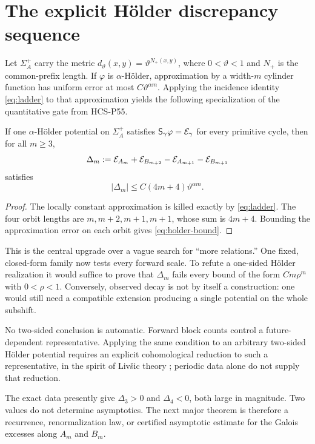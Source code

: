 \section{The explicit H\"older discrepancy sequence}

Let \(\Sigma_A^+\) carry the metric
\(d_\vartheta(x,y)=\vartheta^{N_+(x,y)}\), where \(0<\vartheta<1\) and
\(N_+\) is the common-prefix length.  If \(\varphi\) is
\(\alpha\)-H\"older, approximation by a width-\(m\) cylinder function has
uniform error at most \(C\vartheta^{\alpha m}\).  Applying the incidence
identity \eqref{eq:ladder} to that approximation yields the following
specialization of the quantitative gate from HCS-P55.

\begin{corollary}
\label{cor:holder}
If one \(\alpha\)-H\"older potential on \(\Sigma_A^+\) satisfies
\(\mathsf S_\gamma\varphi=\mathcal E_\gamma\) for every primitive cycle, then for
all \(m\geq3\),
\begin{equation}\label{eq:delta}
 \Delta_m:=\mathcal E_{A_m}+\mathcal E_{B_{m+2}}
 -\mathcal E_{A_{m+1}}-\mathcal E_{B_{m+1}}
\end{equation}
satisfies
\begin{equation}\label{eq:holder-bound}
 |\Delta_m|\leq C(4m+4)\vartheta^{\alpha m}.
\end{equation}
\end{corollary}

\begin{proof}
The locally constant approximation is killed exactly by
\eqref{eq:ladder}.  The four orbit lengths are
\(m,m+2,m+1,m+1\), whose sum is \(4m+4\).  Bounding the approximation error
on each orbit gives \eqref{eq:holder-bound}.
\end{proof}

This is the central upgrade over a vague search for ``more relations.''  One
fixed, closed-form family now tests every forward scale.  To refute a
one-sided H\"older realization it would suffice to prove that \(\Delta_m\)
fails every bound of the form \(Cm\rho^m\) with \(0<\rho<1\).  Conversely,
observed decay is not by itself a construction: one would still need a
compatible extension producing a single potential on the whole subshift.

No two-sided conclusion is automatic.  Forward block counts control a
future-dependent representative.  Applying the same condition to an
arbitrary two-sided H\"older potential requires an explicit cohomological
reduction to such a representative, in the spirit of Liv\v{s}ic theory
\citep{Livshits1972}; periodic data alone do not supply that reduction.

The exact data presently give \(\Delta_3>0\) and \(\Delta_4<0\), both large
in magnitude.  Two values do not determine asymptotics.  The next major
theorem is therefore a recurrence, renormalization law, or certified
asymptotic estimate for the Galois excesses along \(A_m\) and \(B_m\).
